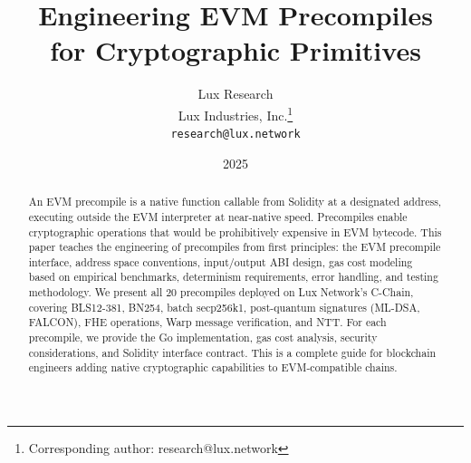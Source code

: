 \documentclass[11pt,a4paper]{article}
\title{Engineering EVM Precompiles\\for Cryptographic Primitives}
\author{
Lux Research \\
Lux Industries, Inc.\thanks{Corresponding author: research@lux.network}\\
\texttt{research@lux.network}
}
\date{2025}
\begin{document}
\luxcoverpage

\begin{abstract}
An EVM precompile is a native function callable from Solidity at a designated address,
executing outside the EVM interpreter at near-native speed. Precompiles enable
cryptographic operations that would be prohibitively expensive in EVM bytecode. This paper
teaches the engineering of precompiles from first principles: the EVM precompile interface,
address space conventions, input/output ABI design, gas cost modeling based on empirical
benchmarks, determinism requirements, error handling, and testing methodology. We present
all 20 precompiles deployed on Lux Network's C-Chain, covering BLS12-381, BN254, batch
secp256k1, post-quantum signatures (ML-DSA, FALCON), FHE operations, Warp message
verification, and NTT. For each precompile, we provide the Go implementation, gas cost
analysis, security considerations, and Solidity interface contract. This is a complete
guide for blockchain engineers adding native cryptographic capabilities to EVM-compatible
chains.
\end{abstract}

\tableofcontents
\newpage














\end{document}
